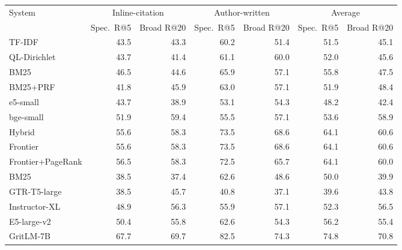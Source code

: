 \begin{tabular}{lrrrrrr}
\toprule
System & \multicolumn{2}{c}{Inline-citation} & \multicolumn{2}{c}{Author-written} & \multicolumn{2}{c}{Average} \\
 & Spec.\ R@5 & Broad R@20 & Spec.\ R@5 & Broad R@20 & Spec.\ R@5 & Broad R@20 \\
\midrule
TF-IDF & 43.5 & 43.3 & 60.2 & 51.4 & 51.5 & 45.1 \\
QL-Dirichlet & 43.7 & 41.4 & 61.1 & 60.0 & 52.0 & 45.6 \\
BM25 & 46.5 & 44.6 & 65.9 & 57.1 & 55.8 & 47.5 \\
BM25{+}PRF & 41.8 & 45.9 & 63.0 & 57.1 & 51.9 & 48.4 \\
e5-small & 43.7 & 38.9 & 53.1 & 54.3 & 48.2 & 42.4 \\
bge-small & 51.9 & 59.4 & 55.5 & 57.1 & 53.6 & 58.9 \\
Hybrid & 55.6 & 58.3 & 73.5 & 68.6 & 64.1 & 60.6 \\
Frontier & 55.6 & 58.3 & 73.5 & 68.6 & 64.1 & 60.6 \\
Frontier{+}PageRank & 56.5 & 58.3 & 72.5 & 65.7 & 64.1 & 60.0 \\
\midrule
BM25 \cite{ajith2024} & 38.5 & 37.4 & 62.6 & 48.6 & 50.0 & 39.9 \\
GTR-T5-large \cite{ajith2024} & 38.5 & 45.7 & 40.8 & 37.1 & 39.6 & 43.8 \\
Instructor-XL \cite{ajith2024} & 48.9 & 56.3 & 55.9 & 57.1 & 52.3 & 56.5 \\
E5-large-v2 \cite{ajith2024} & 50.4 & 55.8 & 62.6 & 54.3 & 56.2 & 55.4 \\
GritLM-7B \cite{ajith2024} & 67.7 & 69.7 & 82.5 & 74.3 & 74.8 & 70.8 \\
\bottomrule
\end{tabular}
